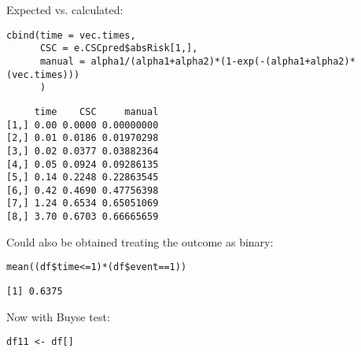 \documentclass{article}
\begin{document}
Expected vs. calculated:
\lstset{language=r,label= ,caption= ,captionpos=b,numbers=none}
\begin{lstlisting}
cbind(time = vec.times,
      CSC = e.CSCpred$absRisk[1,],
      manual = alpha1/(alpha1+alpha2)*(1-exp(-(alpha1+alpha2)*(vec.times)))
      )
\end{lstlisting}

\begin{verbatim}
     time    CSC     manual
[1,] 0.00 0.0000 0.00000000
[2,] 0.01 0.0186 0.01970298
[3,] 0.02 0.0377 0.03882364
[4,] 0.05 0.0924 0.09286135
[5,] 0.14 0.2248 0.22863545
[6,] 0.42 0.4690 0.47756398
[7,] 1.24 0.6534 0.65051069
[8,] 3.70 0.6703 0.66665659
\end{verbatim}

Could also be obtained treating the outcome as binary:
\lstset{language=r,label= ,caption= ,captionpos=b,numbers=none}
\begin{lstlisting}
mean((df$time<=1)*(df$event==1))
\end{lstlisting}

\begin{verbatim}
[1] 0.6375
\end{verbatim}

Now with Buyse test:
\lstset{language=r,label= ,caption= ,captionpos=b,numbers=none}
\begin{lstlisting}
df11 <- df[]
\end{lstlisting}
\end{document}
